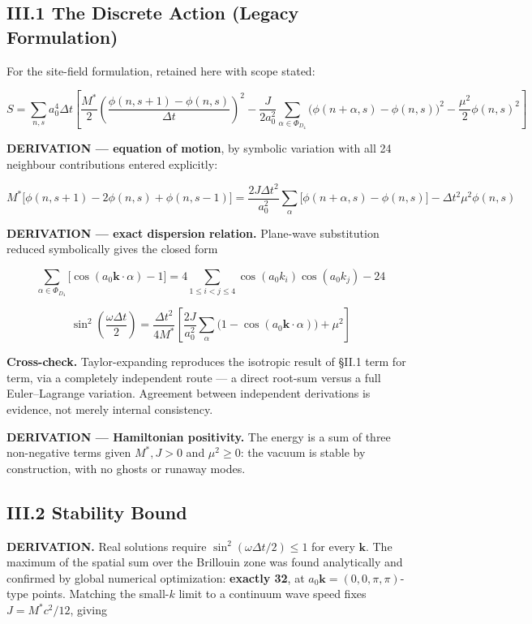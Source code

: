 \documentclass[a4paper,11pt]{article}
\begin{document}
\subsection*{III.1 The Discrete Action (Legacy Formulation)}

For the site-field formulation, retained here with scope stated:

\[S=\sum_{n,s}a_0^4\Delta t\left[\frac{M^{*}}{2}\left(\frac{\phi(n,s{+}1)-\phi(n,s)}{\Delta t}\right)^2-\frac{J}{2a_0^2}\sum_{\alpha\in\Phi_{D_4}}\big(\phi(n{+}\alpha,s)-\phi(n,s)\big)^2-\frac{\mu^2}{2}\phi(n,s)^2\right]\]

\textbf{DERIVATION — equation of motion}, by symbolic variation with all 24 neighbour contributions entered explicitly:

\[M^{*}\big[\phi(n,s{+}1)-2\phi(n,s)+\phi(n,s{-}1)\big]=\frac{2J\Delta t^2}{a_0^2}\sum_{\alpha}\big[\phi(n{+}\alpha,s)-\phi(n,s)\big]-\Delta t^2\mu^2\phi(n,s)\]

\textbf{DERIVATION — exact dispersion relation.} Plane-wave substitution reduced symbolically gives the closed form

\[\sum_{\alpha\in\Phi_{D_4}}\big[\cos(a_0\mathbf k\cdot\alpha)-1\big]=4\!\!\sum_{1\le i<j\le4}\!\!\cos(a_0k_i)\cos(a_0k_j)-24\]

\[\sin^2\!\left(\frac{\omega\Delta t}{2}\right)=\frac{\Delta t^2}{4M^{*}}\left[\frac{2J}{a_0^2}\sum_{\alpha}\big(1-\cos(a_0\mathbf k\cdot\alpha)\big)+\mu^2\right]\]

\textbf{Cross-check.} Taylor-expanding reproduces the isotropic result of §II.1 term for term, via a completely independent route — a direct root-sum versus a full Euler–Lagrange variation. Agreement between independent derivations is evidence, not merely internal consistency.

\textbf{DERIVATION — Hamiltonian positivity.} The energy is a sum of three non-negative terms given $M^{*},J>0$ and $\mu^2\ge0$: the vacuum is stable by construction, with no ghosts or runaway modes.

\subsection*{III.2 Stability Bound}

\textbf{DERIVATION.} Real solutions require $\sin^2(\omega\Delta t/2)\le1$ for every $\mathbf k$. The maximum of the spatial sum over the Brillouin zone was found analytically and confirmed by global numerical optimization: \textbf{exactly 32}, at $a_0\mathbf k=(0,0,\pi,\pi)$-type points. Matching the small-$k$ limit to a continuum wave speed fixes $J=M^{*}c^2/12$, giving
\end{document}
